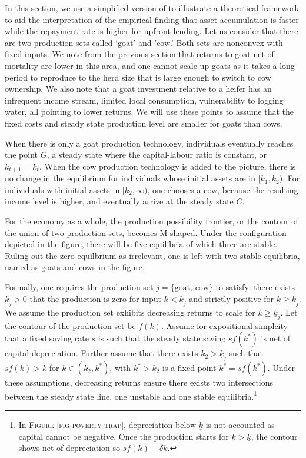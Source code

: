 	In this section, we use a simplified version of \citet{GalorZeira1993} to illustrate a theoretical framework to aid the interpretation of the empirical finding that asset accumulation is faster while the repayment rate is higher for upfront lending. Let us consider that there are two production sets called `goat' and 'cow.' Both sets are nonconvex with fixed inputs. We note from the previous section that returns to goat net of mortality are lower in this area, and one cannot scale up goats as it takes a long period to reproduce to the herd size that is large enough to switch to cow ownership. We also note that a goat investment relative to a heifer has an infrequent income stream, limited local consumption, vulnerability to logging water, all pointing to lower returns. We will use these points to assume that the fixed costs and steady state production level are smaller for goats than cows. 
	
	When there is only a goat production technology, individuals eventually reaches the point $G$, a steady state where the capital-labour ratio is constant, or $k_{t+1}=k_{t}$. When the cow production technology is added to the picture, there is no change in the equlibrium for individuals whose initial assets are in $[k_{1}, k_{2})$. For individuals with initial assets in $[k_{2}, \infty)$, one chooses a cow, because the resulting income level is higher, and eventually arrive at the steady state $C$. 

	For the economy as a whole, the production possibility frontier, or the contour of the union of two production sets, becomes M-shaped. Under the configuration depicted in the figure, there will be five equilibria of which three are stable. Ruling out the zero equilbrium as irrelevant, one is left with two stable equilibria, named as goats and cows in the figure. 
	
	Formally, one requires the production set $j=\{\mbox{goat, cow}\}$ to satisfy: there exists $\underline{k}_{j}>0$ that the production is zero for input $k<\underline{k}_{j}$ and strictly positive for $k\geqslant\underline{k}_{j}$. We assume the production set exhibits decreasing returns to scale for $k\geqslant\underline{k}_{j}$. Let the contour of the production set be $f(k)$. Assume for expositional simplcity that a fixed saving rate $s$ is such that the steady state saving $sf(k^{*})$ is net of capital depreciation. Further assume that there exists $k_{2}>\underline{k}_{j}$ such that $sf(k)>k$ for $k\in(k_{2}, k^{*})$, with $k^{*}>k_{2}$ is a fixed point $k^{*}=sf(k^{*})$. Under these assumptions, decreasing returns ensure there exists two intersections between the steady state line, one unstable and one stable equilibria.\footnote{In \textsc{Figure \ref{fig poverty trap}}, depreciation below $\underline{k}$ is not accounted as capital cannot be negative. Once the production starts for $k>\underline{k}$, the contour shows net of depreciation so $sf(k)-\delta k$. } 

